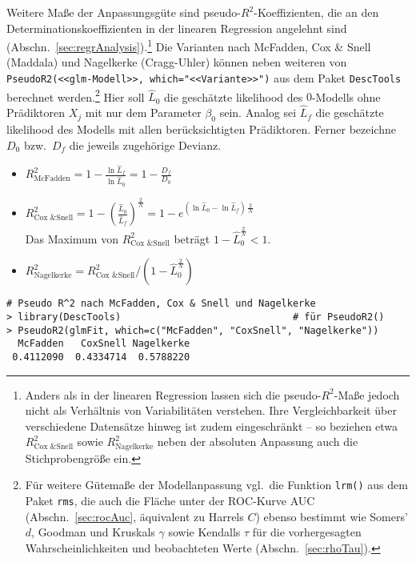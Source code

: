 Weitere Maße der Anpassungsgüte sind pseudo-$R^{2}$-Koeffizienten, die an den Determinationskoeffizienten in der linearen Regression angelehnt sind (Abschn.\ \ref{sec:regrAnalysis}).\footnote{Anders als in der linearen Regression lassen sich die pseudo-$R^{2}$-Maße jedoch nicht als Verhältnis von Variabilitäten verstehen. Ihre Vergleichbarkeit über verschiedene Datensätze hinweg ist zudem eingeschränkt -- so beziehen etwa $R^{2}_{\text{Cox \& Snell}}$ sowie $R^{2}_{\text{Nagelkerke}}$ neben der absoluten Anpassung auch die Stichprobengröße ein.} Die Varianten nach McFadden, Cox \& Snell (Maddala) und Nagelkerke (Cragg-Uhler) können neben weiteren von  \lstinline!PseudoR2(<<glm-Modell>>, which="<<Variante>>")! aus dem Paket \lstinline!DescTools! berechnet werden.\footnote{\label{ftn:rmsLrm}Für weitere Gütemaße der Modellanpassung vgl.\ die Funktion \lstinline!lrm()! aus dem Paket \lstinline!rms!, die auch die Fläche unter der ROC-Kurve AUC (Abschn.\ \ref{sec:rocAuc}, äquivalent zu Harrels $C$) ebenso bestimmt wie Somers' $d$, Goodman und Kruskals $\gamma$ sowie Kendalls $\tau$ für die vorhergesagten Wahrscheinlichkeiten und beobachteten Werte (Abschn.\ \ref{sec:rhoTau}).} Hier soll $\hat{L}_{0}$ die geschätzte likelihood des $0$-Modells ohne Prädiktoren $X_{j}$ mit nur dem Parameter $\beta_{0}$ sein. Analog sei $\hat{L}_{f}$ die geschätzte likelihood des Modells mit allen berücksichtigten Prädiktoren. Ferner bezeichne $D_{0}$ bzw.\ $D_{f}$ die jeweils zugehörige Devianz.
\begin{itemize}
\item $R^{2}_{\text{McFadden}} = 1 - \frac{\ln \hat{L}_{f}}{\ln \hat{L}_{0}} = 1 - \frac{D_{f}}{D_{0}}$
\item $R^{2}_{\text{Cox \& Snell}} = 1 - \left(\frac{\hat{L}_{0}}{\hat{L}_{f}}\right)^{\frac{2}{N}} = 1- e^{(\ln \hat{L}_{0} - \ln \hat{L}_{f}) \, \frac{2}{N}}$\\
      Das Maximum von $R^{2}_{\text{Cox \& Snell}}$ beträgt $1 - \hat{L}_{0}^{\frac{2}{N}} < 1$.
\item $R^{2}_{\text{Nagelkerke}} = R^{2}_{\text{Cox \& Snell}} / (1 - \hat{L}_{0}^{\frac{2}{N}})$
\end{itemize}

\begin{lstlisting}
# Pseudo R^2 nach McFadden, Cox & Snell und Nagelkerke
> library(DescTools)                              # für PseudoR2()
> PseudoR2(glmFit, which=c("McFadden", "CoxSnell", "Nagelkerke"))
  McFadden   CoxSnell Nagelkerke 
 0.4112090  0.4334714  0.5788220
\end{lstlisting}

